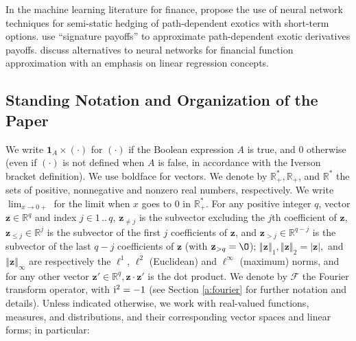 \documentclass[11pt,A4,twoside]{article}
\newcommand\ind{\mathbf{1}}
\numberwithin{equation}{section}
\renewcommand{\vec}{\mathbf}
\newcommand{\F}{\mathcal{F}}
\newcommand{\Norm}[1]{\left\Vert#1 \right\Vert}
\newcommand{\z}{\mathbf{z}}
\newcommand{\R}{\mathbbm{R}}
\theoremstyle{definition}
\theoremstyle{remark}
\def\z{\vec z}
\def\R{\mathbb{R}}
\def\thermi{{\rm i}}%
\begin{document}
In the machine learning literature for finance, \citet*{lokeshwar2019neural} propose the use of neural network techniques for semi-static hedging of path-dependent exotics with short-term options. \citet*{lyons-nejad-perezarribas:2020} use ``signature payoffs'' to approximate path-dependent exotic derivatives payoffs. \citet*{antonov-piterbarg} discuss alternatives to neural networks for financial function approximation with an emphasis on linear regression concepts.


\subsection{Standing Notation and Organization of the Paper\label{ss:not}} 


We write $ \ind_A \times(\cdot)$ for $(\cdot)$ if the Boolean expression $A$ is true, and 0 otherwise (even if $(\cdot)$ is not defined when $A$ is false, in accordance with the Iverson bracket definition). We use boldface for vectors. We denote by $\R_+^*, \R_+$, and $\R^*$ the sets of positive, nonnegative and nonzero real numbers, respectively. We write $\lim_{x\to 0+}$ for the limit when $x$ goes to 0 in $\R_+^*$. For any positive integer $q$, vector $\z \in \R^q$ and index $j \in  1\, .. \, q$, $\z_{\ne j}$ is the subvector excluding the $j$th coefficient of $\z$, $\z_{\leq j}\in\R^{j}$ is the subvector of the first $j$ coefficients of $\z$,  and $\z_{>j}\in\R^{q-j}$ is the subvector of the last $q-j$ coefficients of $\z$ (with $\z_{>q} = \O $);
$\Norm{\z}_1, \Norm{\z}_2 =|\z |,$ and $\Norm{\z}_\infty$ are respectively the $\ell^1$,  $\ell^2$ (Euclidean) and  $\ell^\infty $ (maximum) norms, and for any other vector $\z'\in\R^q, \z\cdot\z'$ is the dot product. We denote by $\F$ the Fourier transform operator, with $\thermi ^2 =-1$ (see Section \ref{a:fourier} for further notation and details).  Unless indicated otherwise, we work with real-valued functions, measures, and distributions, and their corresponding vector spaces and linear forms; in particular:
\end{document}
